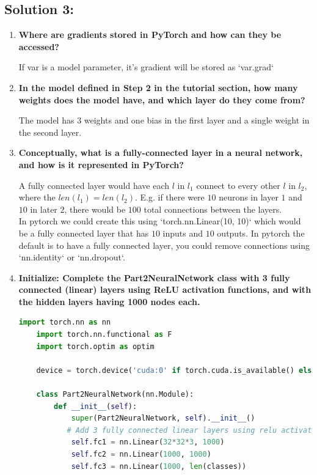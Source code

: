 \documentclass[submit]{harvardml}
\begin{document}
\subsection*{Solution 3:}
\begin{enumerate}
    \item \textbf{Where are gradients stored in PyTorch and how can they be accessed?}
    
    If var is a model parameter, it's gradient will be stored as `var.grad`

    \item \textbf{In the model defined in Step 2 in the tutorial section, how many weights does the model have, and which layer do they come from?}

    The model has 3 weights and one bias in the first layer and a single weight in the second layer.
    
    \item \textbf{Conceptually, what is a fully-connected layer in a neural network, and how is it represented in PyTorch?}
    
    A fully connected layer would have each $l$ in $l_1$ connect to every other $l$ in $l_2$, where the $len(l_1)=len(l_2)$. E.g. if there were $10$ neurons in layer $1$ and $10$ in later $2$, there would be $100$ total connections between the layers.\\
    In pytorch we could create this using `torch.nn.Linear(10, 10)` which would be a fully connected layer that has $10$ inputs and $10$ outputs. In pytorch the default is to have a fully connected layer, you could remove connections using `nn.identity` or `nn.dropout`.
    
    \item \textbf{Initialize: Complete the Part2NeuralNetwork class with 3 fully connected (linear) layers using ReLU activation functions, and with the hidden layers having 1000 nodes each.}
    
    \begin{lstlisting}[language=Python]
    import torch.nn as nn
    import torch.nn.functional as F
    import torch.optim as optim
    
    device = torch.device('cuda:0' if torch.cuda.is_available() else 'cpu')
    
    class Part2NeuralNetwork(nn.Module):
        def __init__(self):
            super(Part2NeuralNetwork, self).__init__()
           # Add 3 fully connected linear layers using relu activations and 1000 nodes
            self.fc1 = nn.Linear(32*32*3, 1000)
            self.fc2 = nn.Linear(1000, 1000)
            self.fc3 = nn.Linear(1000, len(classes))
    

\end{lstlisting}
\end{enumerate}
\end{document}
